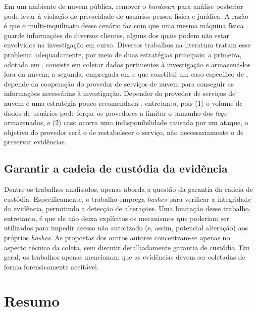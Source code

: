 Em um ambiente de nuvem pública, remover o \textit{hardware} para análise posterior pode levar à violação de privacidade de usuários pessoa física e jurídica.
%
A razão é que o multi-inquilinato desse cenário faz com que uma mesma máquina física guarde informações de diversos clientes, alguns dos quais podem não estar envolvidos na investigação em curso.
%
Diversos trabalhos na literatura tratam esse problema adequadamente, por meio de duas estratégias principais: a primeira, adotada em \cite{ReichertAutoAcquisition:2015,GeorgeDF2CE:2012,PoiselVMI:2013,DykstraFROST:2013,FaaSIndexedSearch:2012}, consiste em coletar dados pertinentes à investigação e armazená-los fora da nuvem; a segunda, empregada em \cite{SangLogApproach:2013} e que constitui um caso específico de \cite{GeorgeDF2CE:2012}, depende da cooperação do provedor de serviços de nuvem para conseguir as informações necessárias à investigação. 
%
Depender do provedor de serviços de nuvem é uma estratégia pouco recomendada  \cite{ClarkeReviewOfChallenges2015}, entretanto, pois (1) o volume de dados de usuários pode forçar os provedores a limitar o tamanho dos \textit{logs} armazenados, e (2) caso ocorra uma indisponibilidade causada por um ataque, o objetivo do provedor será o de restabelecer o serviço, não necessariamente o de preservar evidências. 


\subsection{Garantir a cadeia de custódia da evidência}
\label{sec:cadeiadecustodia}

Dentre os trabalhos analisados, apenas \cite{SangLogApproach:2013} aborda a questão da garantia da cadeia de custódia. 
%
Especificamente, o trabalho emprega \textit{hashes} para verificar a integridade da evidência, permitindo a detecção de alterações.
%
Uma limitação desse trabalho, entretanto, é que ele não deixa explícitos os mecanismos que poderiam ser utilizados para impedir acesso não autorizado (e, assim, potencial alteração) aos próprios \textit{hashes}. 
%
As propostas dos outros autores concentram-se apenas no aspecto técnico da coleta, sem discutir detalhadamente garantia de custódia.
%
Em geral, os trabalhos apenas mencionam que as evidências devem ser coletadas de forma forensicamente aceitável.

\section{Resumo}
\label{sec:resumo}


